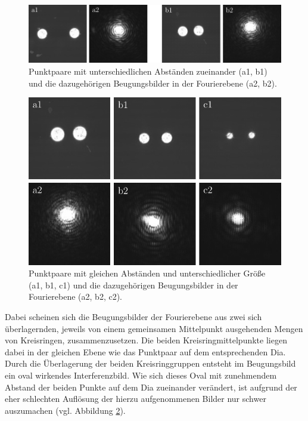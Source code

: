 \begin{figure}[h]
	\centering
	\includegraphics{images/Regina/abb15.pdf}
	\caption[Punktpaare unterschiedlicher Abstände und Fourierspektren]{
		Punktpaare mit unterschiedlichen Abständen zueinander (a1, b1) und die dazugehörigen Beugungsbilder in der Fourierebene (a2, b2).
	}
	\label{fig:punktpaare_verschieden_und_spektren}
\end{figure}

\begin{figure}[h]
	\centering
	\includegraphics{images/Regina/abb16.pdf}
	\caption[Punktpaare gleicher Abstände und Fourierspektren]{
		Punktpaare mit gleichen Abständen und unterschiedlicher Größe (a1, b1, c1) und die dazugehörigen Beugungsbilder in der Fourierebene (a2, b2, c2).
	}
	\label{fig:punktpaare_gleich_und_spektren}
\end{figure}

Dabei scheinen sich die Beugungsbilder der Fourierebene aus zwei sich überlagernden, jeweils von einem gemeinsamen Mittelpunkt ausgehenden Mengen von Kreisringen, zusammenzusetzen. Die beiden Kreisringmittelpunkte liegen dabei in der gleichen Ebene wie das Punktpaar auf dem entsprechenden Dia. Durch die Überlagerung der beiden Kreisringgruppen entsteht im Beugungsbild ein oval wirkendes Interferenzbild. Wie sich dieses Oval mit zunehmendem Abstand der beiden Punkte auf dem Dia zueinander verändert, ist aufgrund der eher schlechten Auflösung der hierzu aufgenommenen Bilder nur schwer auszumachen (vgl. Abbildung \ref{fig:punktpaare_gleich_und_spektren}). 


